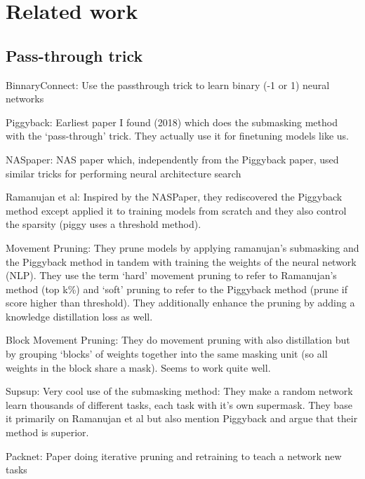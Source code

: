 \documentclass[12pt]{report}
\begin{document}
    \chapter{Related work}


    \section{Pass-through trick}
    BinnaryConnect: Use the passthrough trick to learn binary (-1 or 1) neural networks~\cite{courbariauxBinaryConnectTrainingDeep2016, hubaraBinarizedNeuralNetworks}

    Piggyback: Earliest paper I found (2018) which does the submasking method with the ‘pass-through’ trick. They actually use it for finetuning models like us.~\cite{mallyaPiggybackAdaptingSingle2018}

    NASpaper: NAS paper which, independently from the Piggyback paper, used similar tricks for performing neural architecture
    search~\cite{wortsmanDiscoveringNeuralWirings2019a}

    Ramanujan et al: Inspired by the NASPaper, they rediscovered the Piggyback method except applied it to training models from scratch and they also control the sparsity (piggy uses a threshold method).~\cite{ramanujanWhatHiddenRandomly2020}

    Movement Pruning: They prune models by applying ramanujan’s submasking and the Piggyback method in tandem with training the weights of the neural network (NLP). They use the term ‘hard’ movement pruning to refer to Ramanujan’s method (top k\%) and ‘soft’ pruning to refer to the Piggyback method (prune if score higher than threshold). They additionally enhance the pruning by adding a knowledge distillation loss as well.~\cite{sanhMovementPruningAdaptive}

    Block Movement Pruning: They do movement pruning with also distillation but by grouping ‘blocks’ of weights together into the same masking unit (so all weights in the block share a mask). Seems to work quite well.~\cite{lagunasBlockPruningFaster2021}

    Supsup: Very cool use of the submasking method: They make a random network learn thousands of different tasks, each task with it’s own supermask. They base it primarily on Ramanujan et al but also mention Piggyback and argue that their method is superior.~\cite{wortsmanSupermasksSuperposition}

    Packnet: Paper doing iterative pruning and retraining to teach a network new tasks ~\cite{mallyaPackNetAddingMultiple2018}
\end{document}
